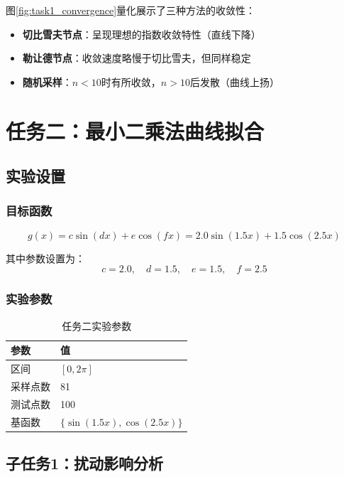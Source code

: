 \documentclass[a4paper,12pt]{article}
\theoremstyle{definition}
\begin{document}
图\ref{fig:task1_convergence}量化展示了三种方法的收敛性：
\begin{itemize}
    \item \textbf{切比雪夫节点}：呈现理想的指数收敛特性（直线下降）
    \item \textbf{勒让德节点}：收敛速度略慢于切比雪夫，但同样稳定
    \item \textbf{随机采样}：$n<10$时有所收敛，$n>10$后发散（曲线上扬）
\end{itemize}

\newpage
\section{任务二：最小二乘法曲线拟合}

\subsection{实验设置}

\subsubsection{目标函数}

\begin{equation}
g(x) = c\sin(dx) + e\cos(fx) = 2.0\sin(1.5x) + 1.5\cos(2.5x)
\end{equation}

其中参数设置为：
\begin{equation}
c = 2.0, \quad d = 1.5, \quad e = 1.5, \quad f = 2.5
\end{equation}

\subsubsection{实验参数}

\begin{table}[h]
\centering
\caption{任务二实验参数}
\begin{tabular}{ll}
\toprule
\textbf{参数} & \textbf{值} \\
\midrule
区间 & $[0, 2\pi]$ \\
采样点数 & 81 \\
测试点数 & 100 \\
基函数 & $\{\sin(1.5x), \cos(2.5x)\}$ \\
\bottomrule
\end{tabular}
\end{table}

\subsection{子任务1：扰动影响分析}
\end{document}
